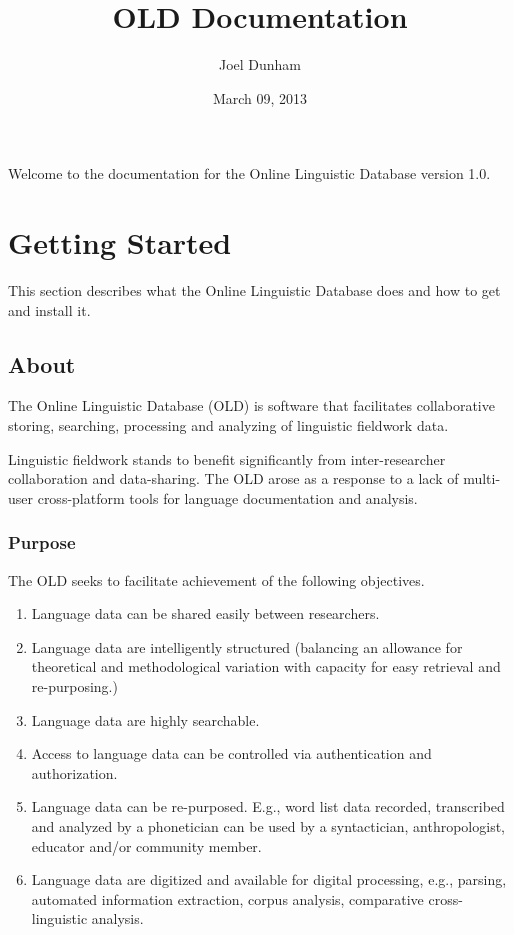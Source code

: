 \documentclass[letterpaper,10pt,english]{sphinxmanual}
\title{OLD Documentation}
\date{March 09, 2013}
\author{Joel Dunham}
\begin{document}
\maketitle
\tableofcontents
{}\label{index::doc}


Welcome to the documentation for the Online Linguistic Database version
1.0.


\chapter{Getting Started}
\label{index:online-linguistic-database-old-documentation}\label{index:getting-started}
This section describes what the Online Linguistic Database does and how to get
and install it.


\section{About}
\label{about:about}\label{about::doc}
The Online Linguistic Database (OLD) is software that facilitates collaborative
storing, searching, processing and analyzing of linguistic fieldwork data.

Linguistic fieldwork stands to benefit significantly from inter-researcher
collaboration and data-sharing.  The OLD arose as a response to a lack of
multi-user cross-platform tools for language documentation and analysis.


\subsection{Purpose}
\label{about:purpose}
The OLD seeks to facilitate achievement of the following objectives.
\begin{enumerate}
\item {} 
Language data can be shared easily between researchers.

\item {} 
Language data are intelligently structured (balancing an allowance for
theoretical and methodological variation with capacity for easy retrieval
and re-purposing.)

\item {} 
Language data are highly searchable.

\item {} 
Access to language data can be controlled via authentication and
authorization.

\item {} 
Language data can be re-purposed.  E.g., word list data recorded, transcribed
and analyzed by a phonetician can be used by a syntactician, anthropologist,
educator and/or community member.

\item {} 
Language data are digitized and available for digital processing, e.g.,
parsing, automated information extraction, corpus analysis, comparative
cross-linguistic analysis.

\end{enumerate}
\end{document}
